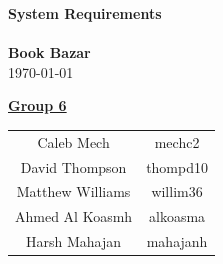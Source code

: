 \documentclass[fullpage]{article}
\begin{document}
\vspace*{\fill}
\begin{center}

  {\Huge \textbf{System Requirements}}\\
\hrulefill\\[2mm]
  {\huge \textbf{Book Bazar}}\\[2mm]
{\large \today}\\[15mm]
{\large
\underline{\textbf{Group 6}}\\
\begin{tabular}{ c c }

 Caleb Mech & mechc2\\ 
 David Thompson & thompd10\\
 Matthew Williams & willim36\\
 Ahmed Al Koasmh & alkoasma\\
 Harsh Mahajan	& mahajanh    
\end{tabular}
}

\end{center}

\vspace*{\fill}

\newpage
\begingroup
\hypersetup{hidelinks}
\tableofcontents

\listoffigures
\listoftables
\endgroup
\newpage
\end{document}
